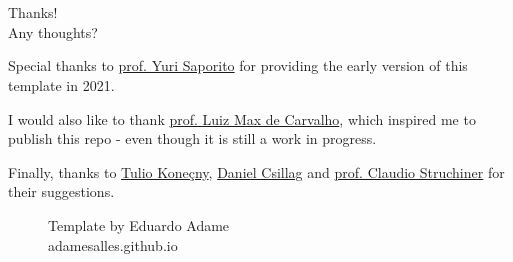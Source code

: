\documentclass[xcolor=dvipsnames,t,aspectratio=169]{beamer} %
\newcommand{\highlight}[1]{{\color{fgv_light_blue} #1}}
\begin{document}
\begin{frame}
    \frametitle{~}
        \vfill
        \begin{center}
            {\Huge Thanks!}\vspace{1.5em}\\
            {\Large \highlight{Any thoughts?}}\\
        \end{center}
        \vfill
        \begin{center} %
            {\small Special thanks to \href{https://yurisaporito.com}{prof. Yuri Saporito} for providing the early version of this template in 2021.
            
            I would also like to thank \href{https://github.com/maxbiostat}{prof. Luiz Max de Carvalho}, which inspired me to publish this repo - even though it is still a work in progress.
            
            Finally, thanks to \href{https://matematicaeparatodos.com/}{Tulio Koneçny}, \href{https://github.com/dccsillag}{Daniel Csillag} and \href{https://emap.fgv.br/en/professors/claudio-jose-struchiner}{prof. Claudio Struchiner} for their suggestions.}
        \end{center}
        
        \begin{figure}[!b] %
            \begin{flushright}
                \small Template by Eduardo Adame\\ \highlight{adamesalles.github.io}
            \end{flushright}
        \end{figure} 
\end{frame}
\end{document}
